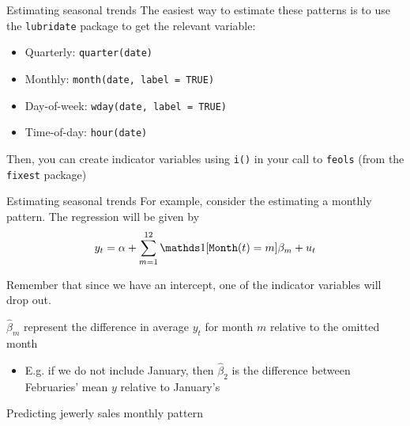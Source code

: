 \documentclass[aspectratio=169,t,11pt,table]{beamer}
\begin{document}
\begin{frame}{Estimating seasonal trends}
  The easiest way to estimate these patterns is to use the \texttt{lubridate} package to get the relevant variable:
  \begin{itemize}
    \item Quarterly: \texttt{quarter(date)}
    \item Monthly: \texttt{month(date, label = TRUE)}
    \item Day-of-week: \texttt{wday(date, label = TRUE)}
    \item Time-of-day: \texttt{hour(date)}
  \end{itemize}

  \bigskip
  Then, you can create indicator variables using \texttt{i()} in your call to \texttt{feols} (from the \texttt{fixest} package)
\end{frame}

\begin{frame}{Estimating seasonal trends}
  For example, consider the estimating a monthly pattern. 
  The regression will be given by
  $$
    y_t = \alpha + \sum_{m = 1}^{12} \one{\texttt{Month}(t) = m} \beta_m + u_t
  $$

  \bigskip
  Remember that since we have an intercept, one of the indicator variables will drop out.
  
  \bigskip
  $\hat{\beta}_m$ represent the difference in average $y_t$ for month $m$ relative to the omitted month 
  \begin{itemize}
    \item E.g. if we do not include January, then $\hat{\beta}_{2}$ is the difference between Februaries' mean $y$ relative to January's
  \end{itemize}
\end{frame}


\begin{frame}[fragile]{Predicting jewerly sales monthly pattern}
\end{frame}
\end{document}

